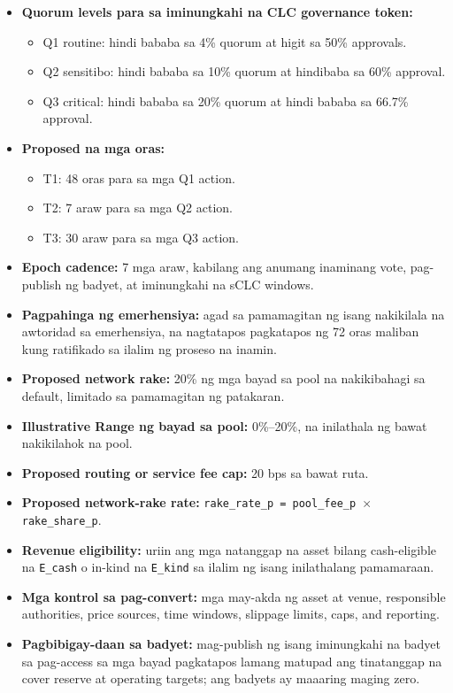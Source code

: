 \documentclass[11pt]{article}
\begin{document}
\begin{itemize}[leftmargin=*]
\item \textbf{Quorum levels para sa iminungkahi na CLC governance token:}
\begin{itemize}[leftmargin=*]
\item Q1 routine: hindi bababa sa 4\% quorum at higit sa 50\% approvals.
\item Q2 sensitibo: hindi bababa sa 10\% quorum at hindibaba sa 60\% approval.
\item Q3 critical: hindi bababa sa 20\% quorum at hindi bababa sa 66.7\% approval.
\end{itemize}
\item \textbf{Proposed na mga oras:}
\begin{itemize}[leftmargin=*]
\item T1: 48 oras para sa mga Q1 action.
\item T2: 7 araw para sa mga Q2 action.
\item T3: 30 araw para sa mga Q3 action.
\end{itemize}
\item \textbf{Epoch cadence:} 7 mga araw, kabilang ang anumang inaminang vote, pag-publish ng badyet, at iminungkahi na sCLC windows.
\item \textbf{Pagpahinga ng emerhensiya:} agad sa pamamagitan ng isang nakikilala na awtoridad sa emerhensiya, na nagtatapos pagkatapos ng 72 oras maliban kung ratifikado sa ilalim ng proseso na inamin.
\item \textbf{Proposed network rake:} 20\% ng mga bayad sa pool na nakikibahagi sa default, limitado sa pamamagitan ng patakaran.
\item \textbf{Illustrative Range ng bayad sa pool:} 0\%--20\%, na inilathala ng bawat nakikilahok na pool.
\item \textbf{Proposed routing or service fee cap:} 20 bps sa bawat ruta.
\item \textbf{Proposed network-rake rate:} \texttt{rake\_rate\_p = pool\_fee\_p $\times$ rake\_share\_p}.
\item \textbf{Revenue eligibility:} uriin ang mga natanggap na asset bilang cash-eligible na \texttt{E\_cash} o in-kind na \texttt{E\_kind} sa ilalim ng isang inilathalang pamamaraan.
\item \textbf{Mga kontrol sa pag-convert:} mga may-akda ng asset at venue, responsible authorities, price sources, time windows, slippage limits, caps, and reporting.
\item \textbf{Pagbibigay-daan sa badyet:} mag-publish ng isang iminungkahi na badyet sa pag-access sa mga bayad pagkatapos lamang matupad ang tinatanggap na cover reserve at operating targets; ang badyets ay maaaring maging zero.

\end{itemize}
\end{document}
